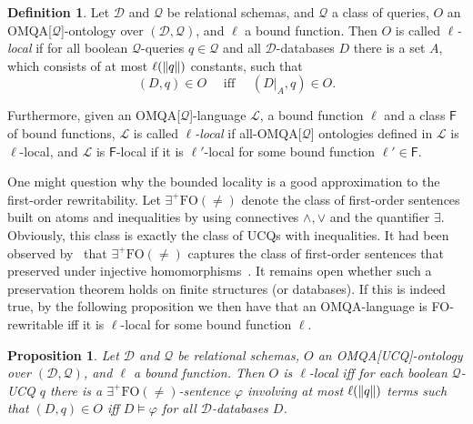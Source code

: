 \documentclass[letterpaper]{article} %
\newtheorem{prop}[thm]{Proposition}
\theoremstyle{definition}
\newtheorem{defn}{Definition}
\theoremstyle{remark}
\theoremstyle{definition}
\begin{document}
\begin{defn}
Let $\mathscr{D}$ and $\mathscr{Q}$ be relational schemas, and $\mathcal{Q}$ a class of queries, $O$ an OMQA[$\mathcal{Q}$]-ontology over $(\mathscr{D},\mathscr{Q})$, and $\ell$ a bound function. Then $O$ is called {\em$\ell$-local} if for all boolean $\mathscr{Q}$-queries ${q}\in\mathcal{Q}$ and all $\mathscr{D}$-databases $D$ there is a set $A$, which consists of at most $\ell(\dl {q}\dl )$ constants, such that 
\begin{equation*}
(D,{q})\in O\quad\text{ iff }\quad(D|_{A},{q})\in O.
\end{equation*}

Furthermore, given an OMQA[$\mathcal{Q}$]-language $\mathcal{L}$, a bound function $\ell$ and a class $\mathsf{F}$ of bound functions, $\mathcal{L}$ is called {\em $\ell$-local} if all-OMQA[$\mathcal{Q}$] ontologies defined in $\mathcal{L}$ is $\ell$-local, and $\mathcal{L}$ is $\mathsf{F}$-local if it is $\ell'$-local for some bound function $\ell'\in\mathsf{F}$. 
\end{defn}

One might question why the bounded locality is a good approximation to the first-order rewritability. Let $\exists^+\text{FO}(\ne)$ denote the class of first-order sentences built on atoms and inequalities by using connectives $\wedge,\vee$ and the quantifier $\exists$. Obviously, this class is exactly the class of UCQs with inequalities. It had been observed by~\citeauthor{Benedikt16} that $\exists^+\text{FO}(\ne)$ captures the class of first-order sentences that preserved under injective homomorphisms~. It remains open whether such a preservation theorem holds on finite structures (or databases). If this is indeed true, by the following proposition we then have that an OMQA-language is FO-rewritable iff it is $\ell$-local for some bound function $\ell$.

\begin{prop}\label{prop:locality2rewritability}
Let $\mathscr{D}$ and $\mathscr{Q}$ be relational schemas, $O$ an OMQA[UCQ]-ontology over $(\mathscr{D},\mathscr{Q})$, and $\ell$ a bound function. Then $O$ is $\ell$-local iff for each boolean $\mathscr{Q}$-UCQ $q$ there is a $\exists^+\text{FO}(\ne)$-sentence $\varphi$ involving at most $\ell(\dl {q}\dl )$ terms such that $(D,q)\in O$ iff $D\models\varphi$ for all $\mathscr{D}$-databases $D$.
\end{prop}
\end{document}

